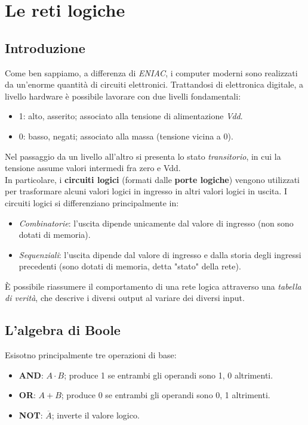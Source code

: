 \documentclass[class=book, crop=false]{standalone}
\begin{document}
\chapter{Le reti logiche}
\section{Introduzione}
Come ben sappiamo, a differenza di \emph{ENIAC}, i computer moderni sono realizzati da un'enorme quantità di circuiti elettronici. Trattandosi di elettronica digitale, a livello hardware è possibile lavorare con due livelli fondamentali:
\begin{itemize}[noitemsep, nolistsep]
	\item 1: alto, asserito; associato alla tensione di alimentazione \emph{Vdd}.
	\item 0: basso, negati; associato alla massa (tensione vicina a 0).
\end{itemize}
Nel passaggio da un livello all'altro si presenta lo stato \emph{transitorio}, in cui la tensione assume valori intermedi fra zero e Vdd.\\
In particolare, i \textbf{circuiti logici} (formati dalle \textbf{porte logiche}) vengono utilizzati per trasformare alcuni valori logici in ingresso in altri valori logici in uscita. I circuiti logici si differenziano principalmente in:
\begin{itemize}[nolistsep, noitemsep]
	\item \emph{Combinatorie}: l'uscita dipende unicamente dal valore di ingresso (non sono dotati di memoria).
	\item \emph{Sequenziali}: l'uscita dipende dal valore di ingresso e dalla storia degli ingressi precedenti (sono dotati di memoria, detta "stato" della rete).
\end{itemize}
\`{E} possibile riassumere il comportamento di una rete logica attraverso una \emph{tabella di verità}, che descrive i diversi output al variare dei diversi input.

\section{L'algebra di Boole}
Esisotno principalmente tre operazioni di base:
\begin{itemize}[noitemsep, nolistsep]
	\item \textbf{AND}: \(A\cdot B\); produce 1 se entrambi gli operandi sono 1, 0 altrimenti.
	\item \textbf{OR}: \(A+B\); produce 0 se entrambi gli operandi sono 0, 1 altrimenti.
	\item \textbf{NOT}: \(\overline{A}\); inverte il valore logico.
\end{itemize}
\end{document}
